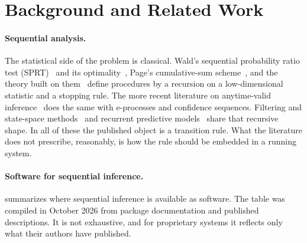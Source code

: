 \documentclass[11pt,a4paper]{article}
\theoremstyle{definition}
\theoremstyle{remark}
\begin{document}
\section{Background and Related Work}
\label{sec:related}

\paragraph{Sequential analysis.}
The statistical side of the problem is classical. Wald's sequential
probability ratio test (SPRT)~\cite{wald1945,wald1947} and its
optimality~\cite{waldwolfowitz1948}, Page's cumulative-sum
scheme~\cite{page1954}, and the theory built on
them~\cite{siegmund1985,poor2009,tartakovsky2014} define procedures by a
recursion on a low-dimensional statistic and a stopping rule. The more
recent literature on anytime-valid inference~\cite{ramdas2023,howard2021}
does the same with e-processes and confidence sequences. Filtering and
state-space
methods~\cite{kalman1960,rabiner1989,doucet2001,sarkka2013,bishop2006,%
murphy2022} and recurrent predictive models~\cite{hochreiter1997} share
that recursive shape. In all of these the published object is a
transition rule. What the literature does not prescribe, reasonably, is
how the rule should be embedded in a running system.

\paragraph{Software for sequential inference.}
 summarizes where sequential inference is available
as software. The table was compiled in October 2026 from package
documentation and published descriptions. It is not exhaustive, and for
proprietary systems it reflects only what their authors have published.
\end{document}
